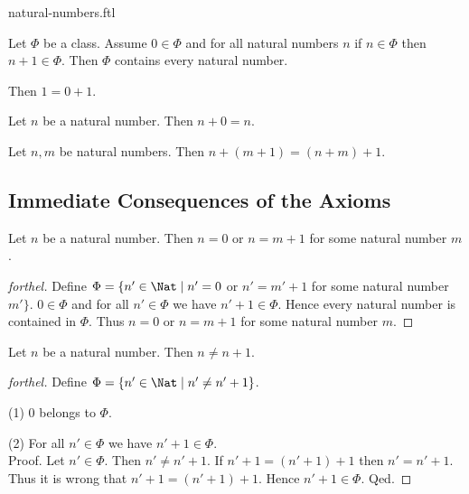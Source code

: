 \documentclass{naproche-library}
\begin{document}
\begin{smodule}{natural-numbers.ftl}
  \begin{axiom}[forthel,title=Induction,id=ARITHMETIC_01_4764664342773760]
    Let $\Phi$ be a class.
    Assume $0 \in \Phi$ and for all natural numbers $n$ if $n \in \Phi$ then
    $n + 1 \in \Phi$.
    Then $\Phi$ contains every natural number.
  \end{axiom}

  \begin{axiom}[forthel,id=ARITHMETIC_03_5962332515874540]
    Then $1 = 0 + 1$.
  \end{axiom}

  \begin{axiom}[forthel,id=ARITHMETIC_03_4827955356237824]
    Let $n$ be a natural number.
    Then $n + 0 = n$.
  \end{axiom}

  \begin{axiom}[forthel,id=ARITHMETIC_03_4427935386238924]
    Let $n, m$ be natural numbers.
    Then $n + (m + 1) = (n + m) + 1$.
  \end{axiom}


  \subsection*{Immediate Consequences of the Axioms}

  \begin{proposition}[forthel,id=ARITHMETIC_01_4966080109871104]
    Let $n$ be a natural number.
    Then $n = 0$ or $n = m + 1$ for some natural number $m$.
  \end{proposition}
  \begin{proof}[forthel]
    Define $\Phi = \{ n' \in \Nat \mid n' = 0$ or $n' = m' + 1$ for some natural number $m' \}$.
    $0 \in \Phi$ and for all $n' \in  \Phi$ we have $n' + 1 \in \Phi$.
    Hence every natural number is contained in $\Phi$.
    Thus $n = 0$ or $n = m + 1$ for some natural number $m$.
  \end{proof}

  \begin{proposition}[forthel,id=ARITHMETIC_01_5996049267163136]
    Let $n$ be a natural number.
    Then $n \neq n + 1$.
  \end{proposition}
  \begin{proof}[forthel]
    Define $\Phi = \{ n' \in \Nat \mid n' \neq n' + 1 \}$.

    (1) $0$ belongs to $\Phi$.

    (2) For all $n' \in \Phi$ we have $n' + 1 \in \Phi$. \\
    Proof.
      Let $n' \in \Phi$.
      Then $n' \neq n' + 1$.
      If $n' + 1 = (n' + 1) + 1$ then $n' = n' + 1$.
      Thus it is wrong that $n' + 1 = (n' + 1) + 1$.
      Hence $n' + 1 \in \Phi$.
    Qed.


\end{proof}
\end{smodule}
\end{document}
